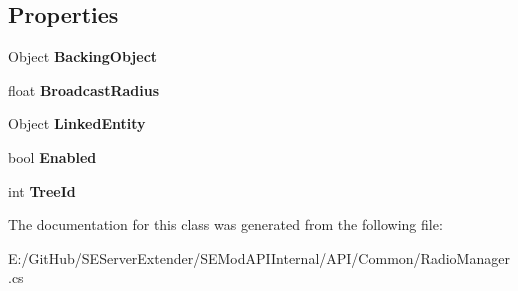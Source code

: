 \subsection*{Properties}
\begin{DoxyCompactItemize}
\item 
\hypertarget{class_s_e_mod_a_p_i_internal_1_1_a_p_i_1_1_common_1_1_radio_manager_acd088456648106d755c7e13334e5d368}{}Object {\bfseries Backing\+Object}\label{class_s_e_mod_a_p_i_internal_1_1_a_p_i_1_1_common_1_1_radio_manager_acd088456648106d755c7e13334e5d368}

\item 
\hypertarget{class_s_e_mod_a_p_i_internal_1_1_a_p_i_1_1_common_1_1_radio_manager_a4491b3e99da0d9ff7e980c2f08763e9c}{}float {\bfseries Broadcast\+Radius}\label{class_s_e_mod_a_p_i_internal_1_1_a_p_i_1_1_common_1_1_radio_manager_a4491b3e99da0d9ff7e980c2f08763e9c}

\item 
\hypertarget{class_s_e_mod_a_p_i_internal_1_1_a_p_i_1_1_common_1_1_radio_manager_a515f1a62a44db3442b417b96595ec294}{}Object {\bfseries Linked\+Entity}\label{class_s_e_mod_a_p_i_internal_1_1_a_p_i_1_1_common_1_1_radio_manager_a515f1a62a44db3442b417b96595ec294}

\item 
\hypertarget{class_s_e_mod_a_p_i_internal_1_1_a_p_i_1_1_common_1_1_radio_manager_a7c39e438a33a30243ffcf72104ce8553}{}bool {\bfseries Enabled}\label{class_s_e_mod_a_p_i_internal_1_1_a_p_i_1_1_common_1_1_radio_manager_a7c39e438a33a30243ffcf72104ce8553}

\item 
\hypertarget{class_s_e_mod_a_p_i_internal_1_1_a_p_i_1_1_common_1_1_radio_manager_a7fd9f52a323dd93ed0a65d6404fec1d5}{}int {\bfseries Tree\+Id}\label{class_s_e_mod_a_p_i_internal_1_1_a_p_i_1_1_common_1_1_radio_manager_a7fd9f52a323dd93ed0a65d6404fec1d5}

\end{DoxyCompactItemize}


The documentation for this class was generated from the following file\+:\begin{DoxyCompactItemize}
\item 
E\+:/\+Git\+Hub/\+S\+E\+Server\+Extender/\+S\+E\+Mod\+A\+P\+I\+Internal/\+A\+P\+I/\+Common/Radio\+Manager.\+cs\end{DoxyCompactItemize}
